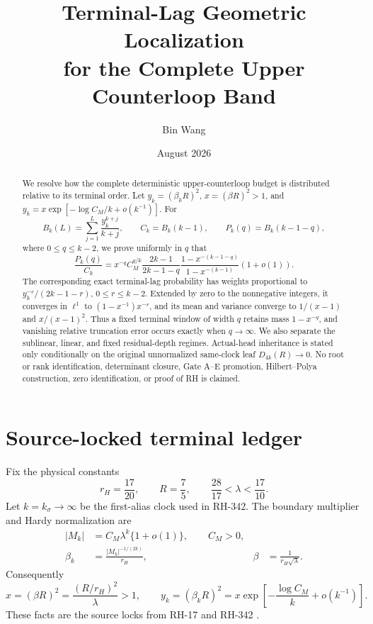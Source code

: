 \documentclass[11pt]{article}
\title{Terminal-Lag Geometric Localization\\
for the Complete Upper Counterloop Band}
\author{Bin Wang}
\date{August 2026}
\theoremstyle{remark}
\begin{document}
\maketitle

\begin{abstract}
We resolve how the complete deterministic upper-counterloop budget is
distributed relative to its terminal order.  Let
$y_k=(\beta_kR)^2$, $x=(\beta R)^2>1$, and
\(y_k=x\exp[-\log C_M/k+o(k^{-1})]\).  For
\[
 B_k(L)=\sum_{j=1}^{L}\frac{y_k^{k+j}}{k+j},\qquad
 C_k=B_k(k-1),\qquad P_k(q)=B_k(k-1-q),
\]
where $0\le q\le k-2$, we prove uniformly in $q$ that
\[
 \frac{P_k(q)}{C_k}
 =x^{-q}C_M^{q/k}\frac{2k-1}{2k-1-q}
 \frac{1-x^{-(k-1-q)}}{1-x^{-(k-1)}}(1+o(1)).
\]
The corresponding exact terminal-lag probability has weights proportional to
$y_k^{-r}/(2k-1-r)$, $0\le r\le k-2$.  Extended by zero to the nonnegative
integers, it converges in $\ell^1$ to
$(1-x^{-1})x^{-r}$, and its mean and variance converge to
$1/(x-1)$ and $x/(x-1)^2$.  Thus a fixed terminal window of width $q$ retains
mass $1-x^{-q}$, and vanishing relative truncation error occurs exactly when
$q\to\infty$.  We also separate the sublinear, linear, and fixed
residual-depth regimes.  Actual-head inheritance is stated only conditionally
on the original unnormalized same-clock leaf $D_{4k}(R)\to0$.  No root or
rank identification, determinant closure, Gate A--E promotion,
Hilbert--Polya construction, zero identification, or proof of RH is claimed.
\end{abstract}

\section{Source-locked terminal ledger}

Fix the physical constants
\begin{equation}\label{eq:constants}
 r_H=\frac{17}{20},\qquad R=\frac75,
 \qquad \frac{28}{17}<\lambda<\frac{17}{10}.
\end{equation}
Let $k=k_\sigma\to\infty$ be the first-alias clock used in RH-342.  The
boundary multiplier and Hardy normalization are
\begin{align}
 |M_k|&=C_M\lambda^k\{1+o(1)\},\qquad C_M>0,\label{eq:multiplier}\\
 \beta_k&=\frac{|M_k|^{-1/(2k)}}{r_H},
 &\beta&=\frac1{r_H\sqrt\lambda}.
\end{align}
Consequently
\begin{equation}\label{eq:x-y}
 x=(\beta R)^2=\frac{(R/r_H)^2}{\lambda}>1,
 \qquad
 y_k=(\beta_kR)^2
 =x\exp\left[-\frac{\log C_M}{k}+o(k^{-1})\right].
\end{equation}
These facts are the source locks from RH-17 and RH-342
\citep{WangTimeOrdered2026,WangHeadCounterloop2026}.
\end{document}
